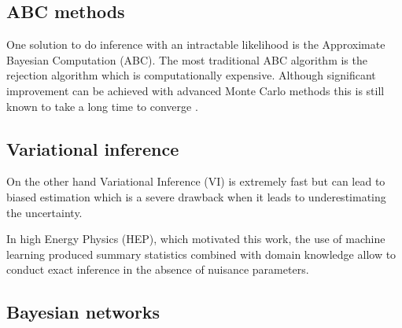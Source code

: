 \subsection{ABC methods} %
\label{sub:abc_methods}



One solution to do inference with an intractable likelihood is the Approximate Bayesian Computation (ABC).
The most traditional ABC algorithm is the rejection algorithm which is computationally expensive.
Although significant improvement can be achieved with advanced Monte Carlo methods this is still known to take a long time to converge \needcite.






\subsection{Variational inference} %
\label{sub:variational_inference}


On the other hand Variational Inference (VI) is extremely fast but can lead to biased estimation which is a severe drawback when it leads to underestimating the uncertainty.

In high Energy Physics (HEP), which motivated this work, the use of machine learning produced summary statistics combined with domain knowledge allow to conduct exact inference in the absence of nuisance parameters.









\subsection{Bayesian networks} %
\label{sub:bayesian_networks}








